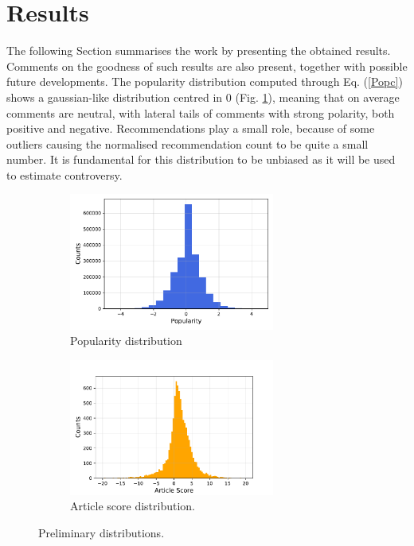 \section{Results}
\label{Resul}

The following Section summarises the work by presenting the obtained results. Comments on the goodness of such results are also present, together with possible future developments. 
The popularity distribution computed through Eq. (\ref{Popc}) shows a gaussian-like distribution centred in 0 (Fig. \ref{PopDist}), meaning that on average comments are neutral, with lateral tails of comments with strong polarity, both positive and negative. Recommendations play a small role, because of some outliers causing the normalised recommendation count to be quite a small number. It is fundamental for this distribution to be unbiased as it will be used to estimate controversy. 

\begin{figure}[b]
\centering
    \begin{subfigure}{0.5\tw}
    \centering
    \includegraphics[height=4.5cm]{Pictures/PopularityDist.pdf}
    \caption{Popularity distribution}
    \label{PopDist}
    \end{subfigure}%
\hfill
    \begin{subfigure}{0.5\tw}
    \centering
    \includegraphics[height=4.5cm]{Pictures/articleScoreDist.pdf}
    \caption{Article score distribution.}
    \label{AScore}
    \end{subfigure}
\caption{Preliminary distributions.}
\end{figure}

